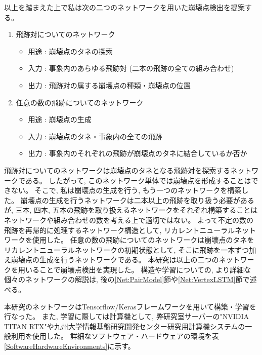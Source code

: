 以上を踏まえた上で私は次の二つのネットワークを用いた崩壊点検出を提案する。

\begin{enumerate}
 \item 飛跡対についてのネットワーク
 \begin{itemize}
  \item 用途 : 崩壊点のタネの探索
  \item 入力 : 事象内のあらゆる飛跡対 (二本の飛跡の全ての組み合わせ)
  \item 出力 : 飛跡対の属する崩壊点の種類・崩壊点の位置
 \end{itemize}
 \item 任意の数の飛跡についてのネットワーク
 \begin{itemize}
  \item 用途 : 崩壊点の生成
  \item 入力 : 崩壊点のタネ・事象内の全ての飛跡
  \item 出力 : 事象内のそれぞれの飛跡が崩壊点のタネに結合しているか否か
 \end{itemize}
\end{enumerate}

飛跡対についてのネットワークは崩壊点のタネとなる飛跡対を探索するネットワークである。
したがって, このネットワーク単体では崩壊点を形成することはできない。
そこで, 私は崩壊点の生成を行う, もう一つのネットワークを構築した。
崩壊点の生成を行うネットワークは二本以上の飛跡を取り扱う必要があるが, 三本, 四本, 五本の飛跡を取り扱えるネットワークをそれぞれ構築することはネットワークや組み合わせの数を考える上で適切ではない。
よって不定の数の飛跡を再帰的に処理するネットワーク構造として, リカレントニューラルネットワークを使用した。
任意の数の飛跡についてのネットワークは崩壊点のタネをリカレントニューラルネットワークの初期状態として, そこに飛跡を一本ずつ加え崩壊点の生成を行うネットワークである。
本研究は以上の二つのネットワークを用いることで崩壊点検出を実現した。
構造や学習についての, より詳細な個々のネットワークの解説は, 後の\ref{Net:PairModel}節や\ref{Net:VertexLSTM}節で述べる。

本研究のネットワークはTensorflow/Kerasフレームワークを用いて構築・学習を行なった。
また, 学習に際しては計算機として, 弊研究室サーバーの"NVIDIA TITAN RTX"や九州大学情報基盤研究開発センター研究用計算機システムの一般利用を使用した。
詳細なソフトウェア・ハードウェアの環境を表\ref{SoftwareHardwareEnvironments}に示す。

